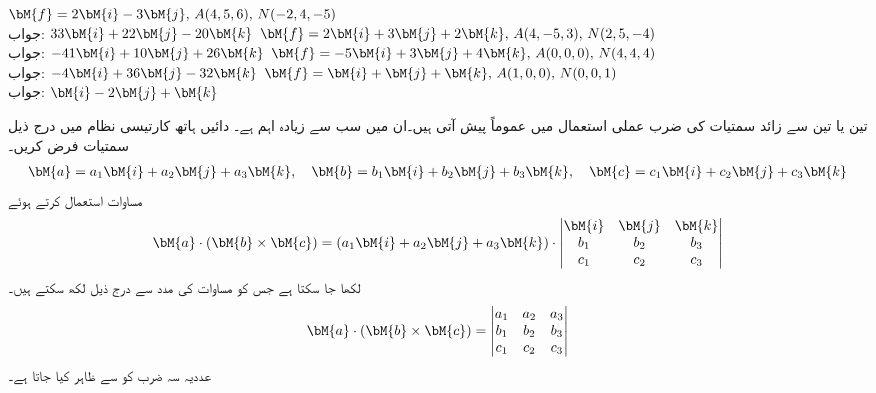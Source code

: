  \quad
$\bM{f}=2\bM{i}-3\bM{j},\, A(4,5,6),\, N(-2,4,-5)$\\
جواب:
$33\bM{i}+22\bM{j}-20\bM{k}$
\quad
$\bM{f}=2\bM{i}+3\bM{j}+2\bM{k},\, A(4,-5,3),\, N(2,5,-4)$\\
جواب:
$-41\bM{i}+10\bM{j}+26\bM{k}$
\quad
$\bM{f}=-5\bM{i}+3\bM{j}+4\bM{k},\, A(0,0,0),\, N(4,4,4)$\\
جواب:
$-4\bM{i}+36\bM{j}-32\bM{k}$
\quad
$\bM{f}=\bM{i}+\bM{j}+\bM{k},\, A(1,0,0),\, N(0,0,1)$\\
جواب:
$\bM{i}-2\bM{j}+\bM{k}$

تین یا تین سے زائد سمتیات کی ضرب عملی استعمال میں عموماً پیش آتی  ہیں۔ان میں سب سے زیادہ اہم 
  ہے۔ دائیں ہاتھ کارتیسی نظام میں درج ذیل سمتیات فرض کریں۔
\begin{align*}
\bM{a}=a_1\bM{i}+a_2\bM{j}+a_3\bM{k}, \quad \bM{b}=b_1\bM{i}+b_2\bM{j}+b_3\bM{k},\quad \bM{c}=c_1\bM{i}+c_2\bM{j}+c_3\bM{k}
\end{align*}
مساوات  استعمال کرتے ہوئے
\begin{align*}
\bM{a}\cdot(\bM{b}\times \bM{c})=(a_1\bM{i}+a_2\bM{j}+a_3\bM{k})\cdot\begin{vmatrix}\bM{i}&\bM{j}&\bM{k}\\b_1&b_2&b_3\\c_1&c_2&c_3  \end{vmatrix}
\end{align*}
لکھا جا سکتا ہے جس کو مساوات  کی مدد سے درج ذیل لکھ سکتے ہیں۔
\begin{align}\label{مساوات_الجبرا_غیر_سمتی_سہ_ضرب_الف}
\bM{a}\cdot(\bM{b}\times \bM{c})=\begin{vmatrix}a_1&a_2&a_3\\b_1&b_2&b_3\\c_1&c_2&c_3  \end{vmatrix}
\end{align}
عددیہ سہ ضرب  کو  سے ظاہر کیا جاتا ہے۔

